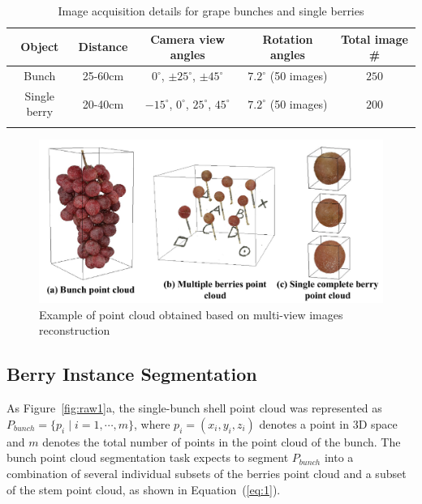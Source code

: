 \documentclass[12pt]{article}
\begin{document}
\begin{table}[h]
    \centering
    \caption{Image acquisition details for grape bunches and single berries}
    \begin{tabular}{ccccc}
        \hline
        \textbf{Object} & \textbf{Distance} & \textbf{Camera view angles} & \textbf{Rotation angles} &  \textbf{Total image \#} \\
        \hline
        Bunch        & 25-60cm & $0^{\circ}$, $\pm 25^{\circ}$, $\pm 45^{\circ}$ & $7.2^{\circ}$ (50 images) & $250$ \\
        Single berry & 20-40cm & $-15^{\circ}$, $0^{\circ}$, $25^{\circ}$, $45^{\circ}$ & $7.2^{\circ}$ (50 images) & $200$ \\
        \hline
    \label{tbl:2}
    \end{tabular}
\end{table}

\begin{figure}[hbt!]
    \centering
    \includegraphics[width=1\textwidth]{figures/Figure4.pdf}
    \caption{Example of point cloud obtained based on multi-view images reconstruction}
    \label{fig:raw10}
\end{figure}

\subsection{Berry Instance Segmentation}
\label{sec:22}

As Figure~\ref{fig:raw1}a, the single-bunch shell point cloud was represented as $P_{bunch}=\{p_i \mid i=1, \cdots, m\}$, where $p_i=(x_i,y_i,z_i)$ denotes a point in 3D space and $m$ denotes the total number of points in the point cloud of the bunch. The bunch point cloud segmentation task expects to segment $P_{bunch}$ into a combination of several individual subsets of the berries point cloud and a subset of the stem point cloud, as shown in Equation~(\ref{eq:1}).
\end{document}
